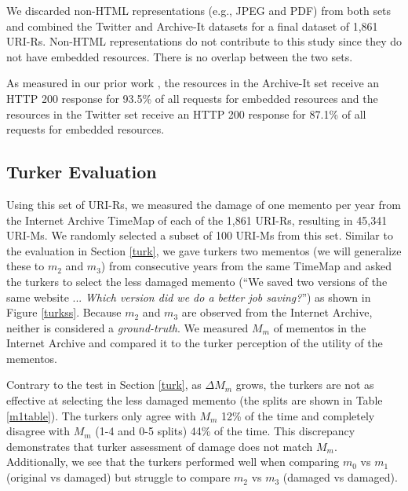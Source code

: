 We discarded non-HTML representations (e.g., JPEG and PDF) from both sets and combined the Twitter and Archive-It datasets for a final dataset of 1,861 URI-Rs. Non-HTML representations do not contribute to this study since they do not have embedded resources. There is no overlap between the two sets.

As measured in our prior work \cite{ijdl}, the resources in the Archive-It set receive an HTTP 200 response for 93.5\% of all requests for embedded resources and the resources in the Twitter set receive an HTTP 200 response for 87.1\% of all requests for embedded resources.

\subsection{Turker Evaluation}
\label{turkEval}

Using this set of URI-Rs, we measured the damage of one memento per year from the Internet Archive TimeMap of each of the 1,861 URI-Rs, resulting in 45,341 URI-Ms. We randomly selected a subset of 100 URI-Ms from this set. Similar to the evaluation in Section \ref{turk}, we gave turkers two mementos (we will generalize these to $m_2$ and $m_3$) from consecutive years from the same TimeMap and asked the turkers to select the less damaged memento (``We saved two versions of the same website ... \emph{Which version did we do a better job saving?}'') as shown in Figure \ref{turkss}. Because $m_2$ and $m_3$ are observed from the Internet Archive, neither is considered a \emph{ground-truth}. We measured $M_m$ of mementos in the Internet Archive and compared it to the turker perception of the utility of the mementos. 

Contrary to the test in Section \ref{turk}, as {$\Delta M_m$} grows, the turkers are not as effective at selecting the less damaged memento (the splits are shown in Table \ref{m1table}). The turkers only agree with $M_m$ 12\% of the time and completely disagree with $M_m$ (1-4 and 0-5 splits) 44\% of the time. This discrepancy demonstrates that turker assessment of damage does not match $M_m$. Additionally, we see that the turkers performed well when comparing $m_0$ vs $m_1$ (original vs damaged) but struggle to compare $m_2$ vs $m_3$ (damaged vs damaged).


